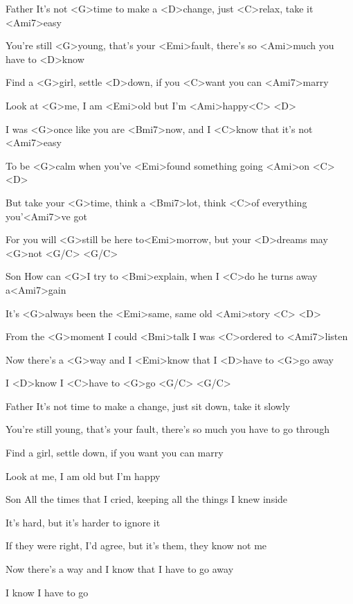 

Father
\zs
It's not <G>time to make a <D>change, just <C>relax, take it <Ami7>easy

You're still <G>young, that's your <Emi>fault, there's so <Ami>much you have to <D>know

Find a <G>girl, settle <D>down, if you <C>want you can <Ami7>marry

Look at <G>me, I am <Emi>old but I'm <Ami>happy<C> <D>
\ks

\zs
I was <G>once like you are <Bmi7>now, and I <C>know that it's not <Ami7>easy

To be <G>calm when you've <Emi>found something going <Ami>on <C> <D>

But take your <G>time, think a <Bmi7>lot, think <C>of everything you'<Ami7>ve got

For you will <G>still be here to<Emi>morrow, but your <D>dreams may <G>not <G/C> <G/C>
\ks

Son
\zs
How can <G>I try to <Bmi>explain, when I <C>do he turns away a<Ami7>gain

It's <G>always been the <Emi>same, same old <Ami>story <C> <D>

From the <G>moment I could <Bmi>talk I was <C>ordered to <Ami7>listen

Now there's a <G>way and I <Emi>know that I <D>have to <G>go away

I <D>know I <C>have to <G>go <G/C> <G/C>\\
\ks

Father
\zs
It's not time to make a change, just sit down, take it slowly

You're still young, that's your fault, there's so much you have to go through

Find a girl, settle down, if you want you can marry

Look at me, I am old but I'm happy
\ks

Son
\zs
All the times that I cried, keeping all the things I knew inside

It's hard, but it's harder to ignore it

If they were right, I'd agree, but it's them, they know not me

Now there's a way and I know that I have to go away

I know I have to go
\ks

\kp
